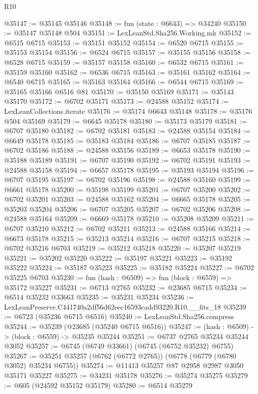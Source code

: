 \begin{lexlean}{R10}
\begin{coremodule}
@35147 := @35145 @35146
@35148 := fun (state : @6643) => @34240
@35150 := @35147 @35148 @504
@35151 := LexLeanStd.Sha256.Working.mk
@35152 := @6515 @6715
@35153 := @35151 @35152
@35154 := @6520 @6715
@35155 := @35153 @35154
@35156 := @6524 @6715
@35157 := @35155 @35156
@35158 := @6528 @6715
@35159 := @35157 @35158
@35160 := @6532 @6715
@35161 := @35159 @35160
@35162 := @6536 @6715
@35163 := @35161 @35162
@35164 := @6540 @6715
@35165 := @35163 @35164
@35166 := @6544 @6715
@35169 := @35165 @35166 @6516 @81
@35170 := @35150 @35169
@35171 := @35143 @35170
@35172 := @6702 @35171
@35173 := @24588 @35152
@35174 := LexLeanCollections.iterate
@35176 := @35174 @6643 @35148
@35178 := @35176 @504 @35169
@35179 := @6645 @35178
@35180 := @35173 @35179
@35181 := @6707 @35180
@35182 := @6702 @35181
@35183 := @24588 @35154
@35184 := @6649 @35178
@35185 := @35183 @35184
@35186 := @6707 @35185
@35187 := @6702 @35186
@35188 := @24588 @35156
@35189 := @6653 @35178
@35190 := @35188 @35189
@35191 := @6707 @35190
@35192 := @6702 @35191
@35193 := @24588 @35158
@35194 := @6657 @35178
@35195 := @35193 @35194
@35196 := @6707 @35195
@35197 := @6702 @35196
@35198 := @24588 @35160
@35199 := @6661 @35178
@35200 := @35198 @35199
@35201 := @6707 @35200
@35202 := @6702 @35201
@35203 := @24588 @35162
@35204 := @6665 @35178
@35205 := @35203 @35204
@35206 := @6707 @35205
@35207 := @6702 @35206
@35208 := @24588 @35164
@35209 := @6669 @35178
@35210 := @35208 @35209
@35211 := @6707 @35210
@35212 := @6702 @35211
@35213 := @24588 @35166
@35214 := @6673 @35178
@35215 := @35213 @35214
@35216 := @6707 @35215
@35218 := @6702 @35216 @6703
@35219 := @35212 @35218
@35220 := @35207 @35219
@35221 := @35202 @35220
@35222 := @35197 @35221
@35223 := @35192 @35222
@35224 := @35187 @35223
@35225 := @35182 @35224
@35227 := @6702 @35225 @6703
@35230 := fun (hash : @6509) => fun (block : @6559) => @35172 @35227
@35231 := @6713 @2765
@35232 := @23685 @6715
@35234 := @6514 @35232 @33663
@35235 := @35231 @35234
@35236 := LexLeanPreserve.C441740a2df56d62eec16593cadd93220.R10.__fits_18
@35239 := @6723 (@35236 @6715 @6516)
@35240 := LexLeanStd.Sha256.compress
@35244 := @35239 (@23685 (@35240 @6715 @6516))
@35247 := (hash : @6509) -> (block : @6559) -> @35235 @35244
@35251 := @6737 @2765 @35234 @35244 @3052
@35257 := @6745 (@6749 @33661) (@6745 (@6752 @35232) @6755)
@35267 := @35251 @35257 (@6762 (@6772 @2765)) (@6778 (@6779 (@6780 @3052) @35234 @6755))
@35274 := @11413 @35257 @87 @2958 @2987 @3050 @35171 @35227
@35275 := @34231 @35178
@35276 := @35274 @35275
@35279 := @605 (@24592 @35152 @35179)
@35280 := @6514 @35279

\end{coremodule}
\end{lexlean}
